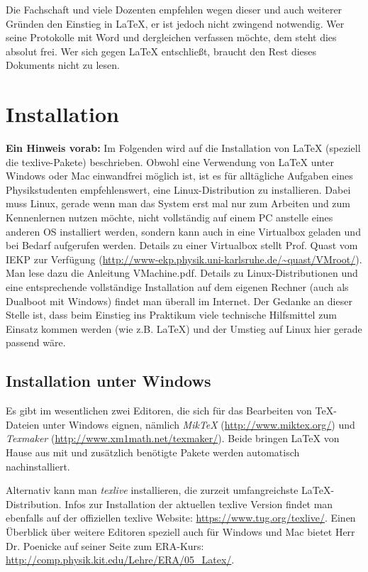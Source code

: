 Die Fachschaft und viele Dozenten empfehlen wegen dieser und auch weiterer Gründen den Einstieg in LaTeX, er ist jedoch nicht zwingend notwendig. Wer seine Protokolle mit Word und dergleichen verfassen möchte, dem steht dies absolut frei. Wer sich gegen LaTeX entschließt, braucht den Rest dieses Dokuments nicht zu lesen.

\section{Installation}
\textbf{Ein Hinweis vorab:} Im Folgenden wird auf die Installation von LaTeX (speziell die texlive-Pakete) beschrieben. Obwohl eine Verwendung von LaTeX unter Windows oder Mac einwandfrei möglich ist, ist es für alltägliche Aufgaben eines Physikstudenten empfehlenswert, eine Linux-Distribution zu installieren. Dabei muss Linux, gerade wenn man das System erst mal nur zum Arbeiten und zum Kennenlernen nutzen möchte, nicht vollständig auf einem PC anstelle eines anderen OS installiert werden, sondern kann auch in eine Virtualbox geladen und bei Bedarf aufgerufen werden. Details zu einer Virtualbox stellt Prof. Quast vom IEKP zur Verfügung (\url{http://www-ekp.physik.uni-karlsruhe.de/~quast/VMroot/}). Man lese dazu die Anleitung \glqq VMachine.pdf\grqq. Details zu Linux-Distributionen und eine entsprechende vollständige Installation auf dem eigenen Rechner (auch als Dualboot mit Windows) findet man überall im Internet. Der Gedanke an dieser Stelle ist, dass beim Einstieg ins Praktikum viele technische Hilfsmittel zum Einsatz kommen werden (wie z.B. LaTeX) und der Umstieg auf Linux hier gerade passend wäre.

\subsection{Installation unter Windows}
Es gibt im wesentlichen zwei Editoren, die sich für das Bearbeiten von TeX-Dateien unter Windows eignen, nämlich \textit{MikTeX} (\url{http://www.miktex.org/}) und \textit{Texmaker} (\url{http://www.xm1math.net/texmaker/}). Beide bringen LaTeX von Hause aus mit und zusätzlich benötigte Pakete werden automatisch nachinstalliert.

Alternativ kann man \textit{texlive} installieren, die zurzeit umfangreichste LaTeX-Distribution. Infos zur Installation der aktuellen texlive Version findet man ebenfalls auf der offiziellen texlive Website: \url{https://www.tug.org/texlive/}. Einen Überblick über weitere Editoren speziell auch für Windows und Mac bietet Herr Dr. Poenicke auf seiner Seite zum ERA-Kurs: \url{http://comp.physik.kit.edu/Lehre/ERA/05_Latex/}.

